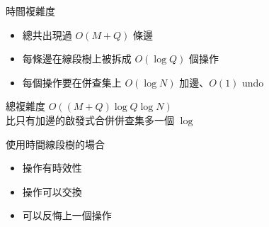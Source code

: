 \begin{frame}{\ebtitle}
    時間複雜度
    
    \begin{itemize}
        \item 總共出現過 $O(M + Q)$ 條邊
        \item 每條邊在線段樹上被拆成 $O(\log Q)$ 個操作
        \item 每個操作要在併查集上 $O(\log N)$ 加邊、$O(1)$ undo
    \end{itemize}

    總複雜度 $O((M + Q) \log Q \log N)$ \\
    比只有加邊的啟發式合併併查集多一個 $\log$
\end{frame}

\begin{frame}{\ebtitle}
    使用時間線段樹的場合
    
    \begin{itemize}
        \item 操作有時效性
        \item 操作可以交換
        \item 可以反悔上一個操作
    \end{itemize}
\end{frame}

% 
